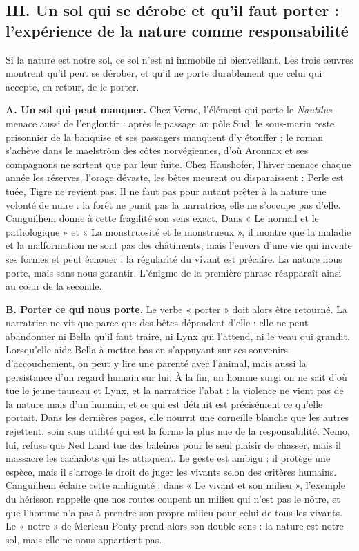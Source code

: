 \documentclass[11pt,a4paper]{article}
\begin{document}
\hypertarget{iii.-un-sol-qui-se-duxe9robe-et-quil-faut-porter-lexpuxe9rience-de-la-nature-comme-responsabilituxe9}{%
\subsection{III. Un sol qui se dérobe et qu'il faut porter : l'expérience de la nature comme responsabilité}\label{iii.-un-sol-qui-se-duxe9robe-et-quil-faut-porter-lexpuxe9rience-de-la-nature-comme-responsabilituxe9}}

Si la nature est notre sol, ce sol n'est ni immobile ni bienveillant. Les trois œuvres montrent qu'il peut se dérober, et qu'il ne porte durablement que celui qui accepte, en retour, de le porter.

\textbf{A. Un sol qui peut manquer.} Chez Verne, l'élément qui porte le \emph{Nautilus} menace aussi de l'engloutir : après le passage au pôle Sud, le sous-marin reste prisonnier de la banquise et ses passagers manquent d'y étouffer ; le roman s'achève dans le maelström des côtes norvégiennes, d'où Aronnax et ses compagnons ne sortent que par leur fuite. Chez Haushofer, l'hiver menace chaque année les réserves, l'orage dévaste, les bêtes meurent ou disparaissent : Perle est tuée, Tigre ne revient pas. Il ne faut pas pour autant prêter à la nature une volonté de nuire : la forêt ne punit pas la narratrice, elle ne s'occupe pas d'elle. Canguilhem donne à cette fragilité son sens exact. Dans « Le normal et le pathologique » et « La monstruosité et le monstrueux », il montre que la maladie et la malformation ne sont pas des châtiments, mais l'envers d'une vie qui invente ses formes et peut échouer : la régularité du vivant est précaire. La nature nous porte, mais sans nous garantir. L'énigme de la première phrase réapparaît ainsi au cœur de la seconde.

\textbf{B. Porter ce qui nous porte.} Le verbe « porter » doit alors être retourné. La narratrice ne vit que parce que des bêtes dépendent d'elle : elle ne peut abandonner ni Bella qu'il faut traire, ni Lynx qui l'attend, ni le veau qui grandit. Lorsqu'elle aide Bella à mettre bas en s'appuyant sur ses souvenirs d'accouchement, on peut y lire une parenté avec l'animal, mais aussi la persistance d'un regard humain sur lui. À la fin, un homme surgi on ne sait d'où tue le jeune taureau et Lynx, et la narratrice l'abat : la violence ne vient pas de la nature mais d'un humain, et ce qui est détruit est précisément ce qu'elle portait. Dans les dernières pages, elle nourrit une corneille blanche que les autres rejettent, soin sans utilité qui est la forme la plus nue de la responsabilité. Nemo, lui, refuse que Ned Land tue des baleines pour le seul plaisir de chasser, mais il massacre les cachalots qui les attaquent. Le geste est ambigu : il protège une espèce, mais il s'arroge le droit de juger les vivants selon des critères humains. Canguilhem éclaire cette ambiguïté : dans « Le vivant et son milieu », l'exemple du hérisson rappelle que nos routes coupent un milieu qui n'est pas le nôtre, et que l'homme n'a pas à prendre son propre milieu pour celui de tous les vivants. Le « notre » de Merleau-Ponty prend alors son double sens : la nature est notre sol, mais elle ne nous appartient pas.
\end{document}
